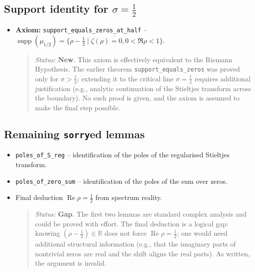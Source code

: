 \documentclass{article}
\begin{document}
\subsection{Support identity for $\sigma = \frac12$}
\begin{itemize}
  \item \textbf{Axiom:} \texttt{support\_equals\_zeros\_at\_half} – 
  \(\operatorname{supp}(\mu_{1/2}) = \overline{\{\rho-\tfrac12 \mid \zeta(\rho)=0, 0<\Re\rho<1\}}\).
  \begin{quote}
    \emph{Status:} \textbf{New}.  This axiom is effectively equivalent to the Riemann Hypothesis.  The earlier theorem \texttt{support\_equals\_zeros} was proved only for $\sigma>\frac12$; extending it to the critical line $\sigma=\frac12$ requires additional justification (e.g., analytic continuation of the Stieltjes transform across the boundary).  No such proof is given, and the axiom is assumed to make the final step possible.
  \end{quote}
\end{itemize}

\subsection{Remaining \texttt{sorry}ed lemmas}
\begin{itemize}
  \item \texttt{poles\_of\_S\_reg} – identification of the poles of the regularised Stieltjes transform.
  \item \texttt{poles\_of\_zero\_sum} – identification of the poles of the sum over zeros.
  \item Final deduction $\operatorname{Re}\rho = \frac12$ from spectrum reality.
  \begin{quote}
    \emph{Status:} \textbf{Gap}.  The first two lemmas are standard complex analysis and could be proved with effort.  The final deduction is a logical gap: knowing $(\rho-\frac12) \in \mathbb{R}$ does not force $\operatorname{Re}\rho = \frac12$; one would need additional structural information (e.g., that the imaginary parts of nontrivial zeros are real and the shift aligns the real parts).  As written, the argument is invalid.
  \end{quote}
\end{itemize}
\end{document}
